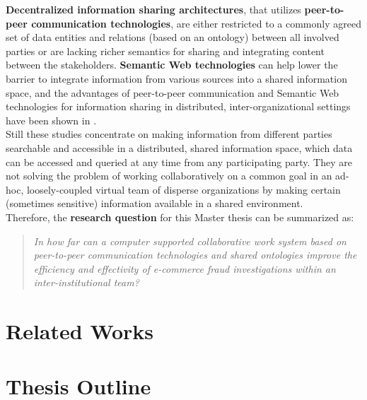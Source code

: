 \textbf{Decentralized information sharing architectures}, that utilizes \textbf{peer-to-peer communication technologies}, are either restricted to a commonly agreed set of data entities and relations (based on an ontology) between all involved parties
or are lacking richer semantics for sharing and integrating content between the stakeholders. \textbf{Semantic Web technologies} can help lower the barrier to integrate information from various sources into a shared information space,
and the advantages of peer-to-peer communication and Semantic Web technologies for information sharing in distributed, inter-organizational settings have been shown in \citep{Staab2006}. \\

Still these studies concentrate on making information from different parties searchable and accessible in a distributed, shared information space, which data can be accessed and queried at any time from any participating party.
They are not solving the problem of working collaboratively on a common goal in an ad-hoc, loosely-coupled virtual team of disperse organizations by making certain (sometimes sensitive) information available in a shared environment. \\

Therefore, the \textbf{research question} for this Master thesis can be summarized as:
\begin{quotation}
  \textit{In how far can a computer supported collaborative work system based on peer-to-peer communication technologies and shared ontologies improve the efficiency and effectivity of e-commerce fraud investigations within an inter-institutional team?}
\end{quotation}


\section{Related Works}
\label{sec:related_works}


\section{Thesis Outline}
\label{sec:thesis_outline}


